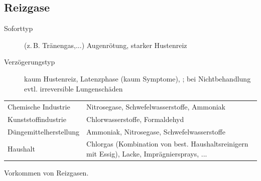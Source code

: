 \subsection{Reizgase}

{
\begin{description}
  \item[Soforttyp] (z.\,B. Tränengas,...) Augenrötung, starker Hustenreiz
  \item[Verzögerungstyp]  kaum
  Hustenreiz, Latenzphase (kaum Symptome), ; bei Nichtbehandlung evtl.
  irreversible Lungenschäden
\end{description}
}{

}{}{}{}

{

}{

}{
\begin{tabulary}{\linewidth}{LL}
 & 
\\\midrule
Chemische Industrie 
&
Nitrosegase,  Schwefelwasserstoffe, Ammoniak
\\\addlinespace
Kunststoffindustrie 
&
Chlorwasserstoffe,  Formaldehyd
\\\addlinespace
Düngemittelherstellung 
&
Ammoniak,  Nitrosegase, Schwefelwasserstoffe
\\\addlinespace
Haushalt 
&
Chlorgas (Kombination von best.  Haushaltsreinigern mit
Essig), Lacke,  Imprägniersprays, ...
\\\bottomrule
\end{tabulary}
}{Vorkommen von Reizgasen.}{}





